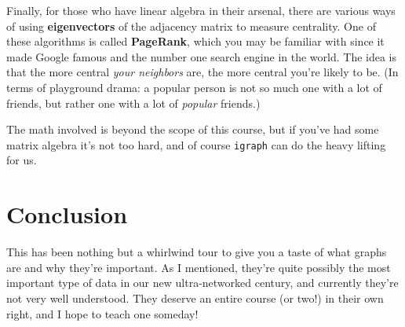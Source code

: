 \bigskip


Finally, for those who have linear algebra in their arsenal, there are various
ways of using \textbf{eigenvectors} of the adjacency matrix to measure
centrality. One of these algorithms is called \textbf{PageRank}, which you may
be familiar with since it made Google famous and the number one search engine
in the world. The idea is that the more central \textit{your neighbors} are,
the more central you're likely to be. (In terms of playground drama: a popular
person is not so much one with a lot of friends, but rather one with a lot of
\textit{popular} friends.)


The math involved is beyond the scope of this course, but if you've had some
matrix algebra it's not too hard, and of course \texttt{igraph} can do the
heavy lifting for us.


\section{Conclusion}

This has been nothing but a whirlwind tour to give you a taste of what graphs
are and why they're important. As I mentioned, they're quite possibly the most
important type of data in our new ultra-networked century, and currently
they're not very well understood. They deserve an entire course (or two!) in
their own right, and I hope to teach one someday!